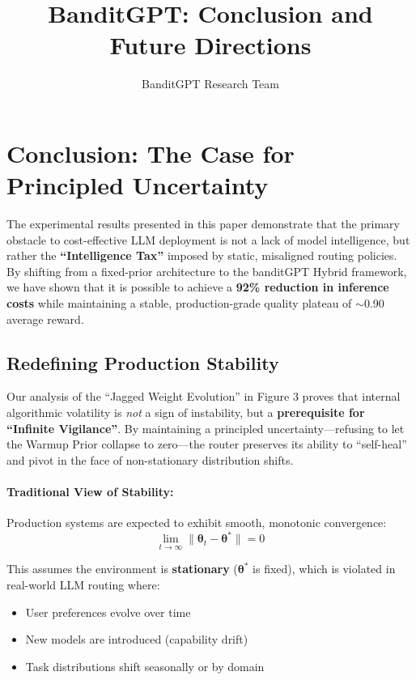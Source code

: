 \documentclass[sigconf]{acmart}
\begin{document}
\title{BanditGPT: Conclusion and Future Directions}

\author{BanditGPT Research Team}

\maketitle

\section{Conclusion: The Case for Principled Uncertainty}

The experimental results presented in this paper demonstrate that the primary obstacle to cost-effective LLM deployment is not a lack of model intelligence, but rather the \textbf{``Intelligence Tax''} imposed by static, misaligned routing policies. By shifting from a fixed-prior architecture to the banditGPT Hybrid framework, we have shown that it is possible to achieve a \textbf{92\% reduction in inference costs} while maintaining a stable, production-grade quality plateau of $\sim$0.90 average reward.

\subsection{Redefining Production Stability}

Our analysis of the ``Jagged Weight Evolution'' in Figure 3 proves that internal algorithmic volatility is \emph{not} a sign of instability, but a \textbf{prerequisite for ``Infinite Vigilance''}. By maintaining a principled uncertainty---refusing to let the Warmup Prior collapse to zero---the router preserves its ability to ``self-heal'' and pivot in the face of non-stationary distribution shifts.

\paragraph{Traditional View of Stability:}
Production systems are expected to exhibit smooth, monotonic convergence:
\begin{equation}
\lim_{t \to \infty} \|\boldsymbol{\theta}_t - \boldsymbol{\theta}^*\| = 0
\end{equation}

This assumes the environment is \textbf{stationary} ($\boldsymbol{\theta}^*$ is fixed), which is violated in real-world LLM routing where:
\begin{itemize}
    \item User preferences evolve over time
    \item New models are introduced (capability drift)
    \item Task distributions shift seasonally or by domain
\end{itemize}
\end{document}
